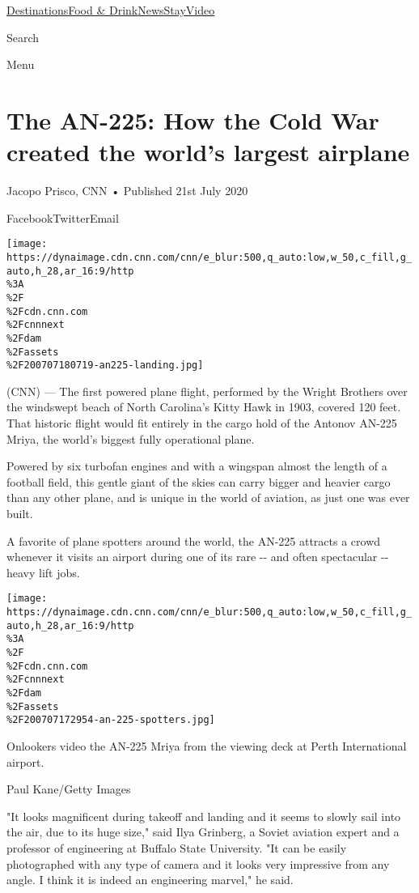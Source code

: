 \href{/}{}\href{/travel}{}

\href{/travel/destinations}{Destinations}\href{/travel/food-and-drink}{Food
\&
Drink}\href{/travel/news}{News}\href{/travel/stay}{Stay}\href{/travel/videos}{Video}

Search

Menu

\hypertarget{the-an-225-how-the-cold-war-created-the-worlds-largest-airplane}{%
\section{The AN-225: How the Cold War created the world's largest
airplane}\label{the-an-225-how-the-cold-war-created-the-worlds-largest-airplane}}

Jacopo Prisco, CNN • Published 21st July 2020

FacebookTwitterEmail

\texttt{[image: https://dynaimage.cdn.cnn.com/cnn/e\_blur:500,q\_auto:low,w\_50,c\_fill,g\_auto,h\_28,ar\_16:9/http\\\%3A\\\%2F\\\%2Fcdn.cnn.com\\\%2Fcnnnext\\\%2Fdam\\\%2Fassets\\\%2F200707180719-an225-landing.jpg]}

(CNN) --- The first powered plane flight, performed by the Wright
Brothers over the windswept beach of North Carolina's Kitty Hawk in
1903, covered 120 feet. That historic flight would fit entirely in the
cargo hold of the Antonov AN-225 Mriya, the world's biggest fully
operational plane.

Powered by six turbofan engines and with a wingspan almost the length of
a football field, this gentle giant of the skies can carry bigger and
heavier cargo than any other plane, and is unique in the world of
aviation, as just one was ever built.

A favorite of plane spotters around the world, the AN-225 attracts a
crowd whenever it visits an airport during one of its rare -\/- and
often spectacular -\/- heavy lift jobs.

\texttt{[image: https://dynaimage.cdn.cnn.com/cnn/e\_blur:500,q\_auto:low,w\_50,c\_fill,g\_auto,h\_28,ar\_16:9/http\\\%3A\\\%2F\\\%2Fcdn.cnn.com\\\%2Fcnnnext\\\%2Fdam\\\%2Fassets\\\%2F200707172954-an-225-spotters.jpg]}

Onlookers video the AN-225 Mriya from the viewing deck at Perth
International airport.

Paul Kane/Getty Images

"It looks magnificent during takeoff and landing and it seems to slowly
sail into the air, due to its huge size," said Ilya Grinberg, a Soviet
aviation expert and a professor of engineering at Buffalo State
University. "It can be easily photographed with any type of camera and
it looks very impressive from any angle. I think it is indeed an
engineering marvel," he said.

